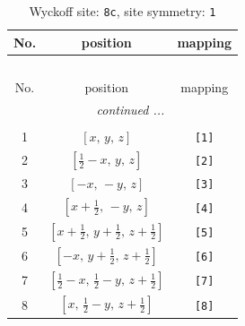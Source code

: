 \documentclass[fleqn,8pt]{jsarticle}
\begin{document}
\renewcommand{\arraystretch}{1.2}
\begin{longtable}{ccc}
\caption{Wyckoff site: {\tt 8c}, site symmetry: {\tt 1}}
 \\
 \hline \hline
No. & position & mapping \\ \hline \endfirsthead

\multicolumn{2}{l}{\tablename\ \thetable{}} \\
 \hline \hline
No. & position & mapping \\ \hline \endhead

 \hline \hline
\multicolumn{2}{r}{\footnotesize\it continued ...} \\ \endfoot

 \hline \hline
\multicolumn{2}{r}{} \\ \endlastfoot

1 & $\left[ x,\, y,\, z \right]$ & {\tt [1]} \\ \hline
2 & $\left[ \frac{1}{2} - x,\, y,\, z \right]$ & {\tt [2]} \\ \hline
3 & $\left[ - x,\, - y,\, z \right]$ & {\tt [3]} \\ \hline
4 & $\left[ x + \frac{1}{2},\, - y,\, z \right]$ & {\tt [4]} \\ \hline
5 & $\left[ x + \frac{1}{2},\, y + \frac{1}{2},\, z + \frac{1}{2} \right]$ & {\tt [5]} \\ \hline
6 & $\left[ - x,\, y + \frac{1}{2},\, z + \frac{1}{2} \right]$ & {\tt [6]} \\ \hline
7 & $\left[ \frac{1}{2} - x,\, \frac{1}{2} - y,\, z + \frac{1}{2} \right]$ & {\tt [7]} \\ \hline
8 & $\left[ x,\, \frac{1}{2} - y,\, z + \frac{1}{2} \right]$ & {\tt [8]} \\
\end{longtable}
\end{document}
